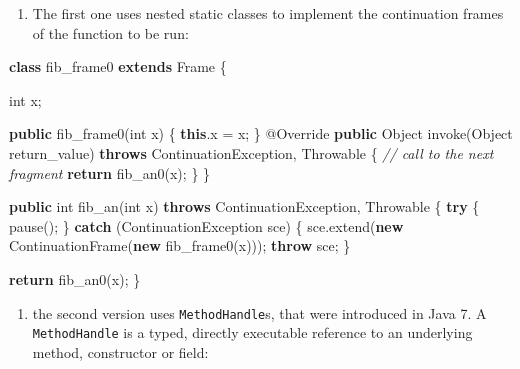 \documentclass[12pt,a4paper,oneside,openright]{book}
\newenvironment{Shaded}{\begin{snugshade}}{\end{snugshade}}
\newcommand{\KeywordTok}[1]{\textcolor[rgb]{0.13,0.29,0.53}{\textbf{{#1}}}}
\newcommand{\DataTypeTok}[1]{\textcolor[rgb]{0.13,0.29,0.53}{{#1}}}
\newcommand{\CommentTok}[1]{\textcolor[rgb]{0.56,0.35,0.01}{\textit{{#1}}}}
\newcommand{\FunctionTok}[1]{\textcolor[rgb]{0.00,0.00,0.00}{{#1}}}
\newcommand{\NormalTok}[1]{{#1}}
\providecommand{\tightlist}{%
  \setlength{\itemsep}{0pt}\setlength{\parskip}{0pt}}
\begin{document}
\begin{enumerate}
\def\labelenumi{\arabic{enumi}.}
\tightlist
\item
  The first one uses nested static classes to implement the continuation
  frames of the function to be run:
\end{enumerate}

\begin{Shaded}
\begin{Highlighting}[]
    \KeywordTok{class} \NormalTok{fib_frame0 }\KeywordTok{extends} \NormalTok{Frame \{}

        \DataTypeTok{int} \NormalTok{x;}

        \KeywordTok{public} \FunctionTok{fib_frame0}\NormalTok{(}\DataTypeTok{int} \NormalTok{x) \{ }\KeywordTok{this}\NormalTok{.}\FunctionTok{x} \NormalTok{= x; \}}
        \FunctionTok{@Override}
        \KeywordTok{public} \NormalTok{Object }\FunctionTok{invoke}\NormalTok{(Object return_value)}
                \KeywordTok{throws} \NormalTok{ContinuationException, Throwable \{}
            \CommentTok{// call to the next fragment}
            \KeywordTok{return} \FunctionTok{fib_an0}\NormalTok{(x);}
        \NormalTok{\}}
    \NormalTok{\}}

    \KeywordTok{public} \DataTypeTok{int} \FunctionTok{fib_an}\NormalTok{(}\DataTypeTok{int} \NormalTok{x)}
          \KeywordTok{throws} \NormalTok{ContinuationException, Throwable \{}
        \KeywordTok{try} \NormalTok{\{}
            \FunctionTok{pause}\NormalTok{();}
        \NormalTok{\} }\KeywordTok{catch} \NormalTok{(ContinuationException sce) \{}
            \NormalTok{sce.}\FunctionTok{extend}\NormalTok{(}\KeywordTok{new} \FunctionTok{ContinuationFrame}\NormalTok{(}\KeywordTok{new} \FunctionTok{fib_frame0}\NormalTok{(x)));}
            \KeywordTok{throw} \NormalTok{sce;}
        \NormalTok{\}}

        \KeywordTok{return} \FunctionTok{fib_an0}\NormalTok{(x);}
    \NormalTok{\}}
\end{Highlighting}
\end{Shaded}

\begin{enumerate}
\def\labelenumi{\arabic{enumi}.}
\setcounter{enumi}{1}
\tightlist
\item
  the second version uses \texttt{MethodHandle}s, that were introduced
  in Java 7. A \texttt{MethodHandle} is a typed, directly executable
  reference to an underlying method, constructor or field:
\end{enumerate}
\end{document}
